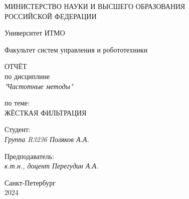 \thispagestyle{empty}

\begin{center}
    МИНИСТЕРСТВО НАУКИ И ВЫСШЕГО ОБРАЗОВАНИЯ \\ РОССИЙСКОЙ ФЕДЕРАЦИИ

    \vspace{20pt}

    Университет ИТМО

    \vspace{20pt}

    Факультет систем управления и робототехники
\end{center}

\vfill

\begin{center}
    ОТЧЁТ \\  
    по дисциплине \\
    \textit{"Частотные методы"}

    \vspace{20pt}

    по теме: \\
    \uppercase{Жёсткая фильтрация}
\end{center}

\vfill

    \noindent Студент: \\
    \textit{Группа R3236 \hfill Поляков А.А.}

    \vspace{20pt}

    \noindent Предподаватель: \\
    \textit{к.т.н., доцент \hfill Перегудин А.А.}

\vfill

\begin{center}
    Санкт-Петербург \\ 2024
\end{center}
